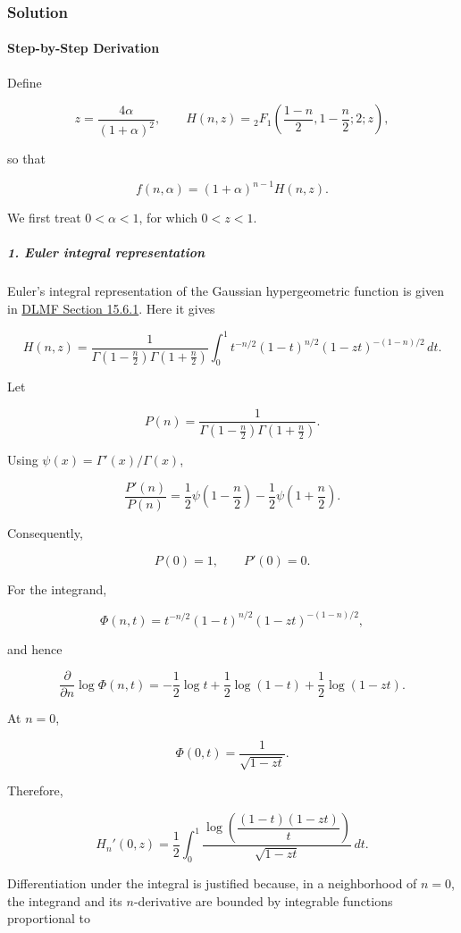 \subsubsection*{Solution}
\paragraph*{Step-by-Step Derivation}

Define

\[
z=\frac{4\alpha}{(1+\alpha)^2}, \qquad H(n,z)={}_2F_1\left(\frac{1-n}{2},1-\frac n2;2;z\right),
\]

so that

\[
f(n,\alpha)=(1+\alpha)^{n-1}H(n,z).
\]

We first treat $0<\alpha<1$, for which $0<z<1$.

\subparagraph*{1. Euler integral representation}

Euler's integral representation of the Gaussian hypergeometric function is given in \href{\detokenize{https://dlmf.nist.gov/15.6.E1}}{DLMF Section 15.6.1}. Here it gives

\[
H(n,z) = \frac{1}{ \Gamma\left(1-\frac n2\right) \Gamma\left(1+\frac n2\right)} \int_0^1 t^{-n/2}(1-t)^{n/2}(1-zt)^{-(1-n)/2}\,dt.
\]

Let

\[
P(n)= \frac{1}{ \Gamma\left(1-\frac n2\right) \Gamma\left(1+\frac n2\right)}.
\]

Using $\psi(x)=\Gamma'(x)/\Gamma(x)$,

\[
\frac{P'(n)}{P(n)} = \frac12\psi\left(1-\frac n2\right) -\frac12\psi\left(1+\frac n2\right).
\]

Consequently,

\[
P(0)=1, \qquad P'(0)=0.
\]

For the integrand,

\[
\Phi(n,t)=t^{-n/2}(1-t)^{n/2}(1-zt)^{-(1-n)/2},
\]

and hence

\[
\frac{\partial}{\partial n}\log\Phi(n,t) = -\frac12\log t +\frac12\log(1-t) +\frac12\log(1-zt).
\]

At $n=0$,

\[
\Phi(0,t)=\frac1{\sqrt{1-zt}}.
\]

Therefore,

\[
H_n'(0,z) = \frac12\int_0^1 \frac{ \log\left(\dfrac{(1-t)(1-zt)}{t}\right) }{ \sqrt{1-zt} }\,dt. \tag{1}
\]

Differentiation under the integral is justified because, in a neighborhood of $n=0$, the integrand and its $n$-derivative are bounded by integrable functions proportional to

